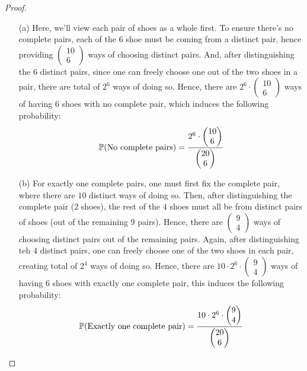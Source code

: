 \documentclass{article}
\begin{document}
\begin{proof}
    \begin{itemize}
        \item[(a)] Here, we'll view each pair of shoes as a whole first. To ensure there's no complete pairs, each of the $6$ shoe must be coming from a distinct pair, hence providing $\begin{pmatrix}10\\6\end{pmatrix}$ ways of choosing distinct pairs. And, after distinguishing the $6$ distinct pairs, since one can freely choose one out of the two shoes in a pair, there are total of $2^6$ ways of doing so. Hence, there are $2^6\cdot \begin{pmatrix}10\\6\end{pmatrix}$ ways of having $6$ shoes with no complete pair, which induces the following probability:
        \begin{align}
            \mathbb{P}(\textmd{No complete pairs})=\frac{2^6\cdot \begin{pmatrix}10\\6\end{pmatrix}}{\begin{pmatrix}20\\6\end{pmatrix}}
        \end{align}
        \item[(b)] For exactly one complete pairs, one must first fix the complete pair, where there are $10$ distinct ways of doing so. Then, after distinguishing the complete pair ($2$ shoes), the rest of the $4$ shoes must all be from distinct pairs of shoes (out of the remaining $9$ pairs). Hence, there are $\begin{pmatrix}9\\4\end{pmatrix}$ ways of choosing distinct pairs out of the remaining pairs. Again, after distinguishing teh $4$ distinct pairs, one can freely choose one of the two shoes in each pair, creating total of $2^4$ ways of doing so. Hence, there are $10\cdot 2^6\cdot \begin{pmatrix}9\\4\end{pmatrix}$ ways of having $6$ shoes with exactly one complete pair, this induces the following probability:
        \begin{align}
            \PP(\textmd{Exactly one complete pair})=\frac{10\cdot 2^6\cdot \begin{pmatrix}9\\4\end{pmatrix}}{\begin{pmatrix}20\\6\end{pmatrix}}

\end{align}
\end{itemize}
\end{proof}
\end{document}
